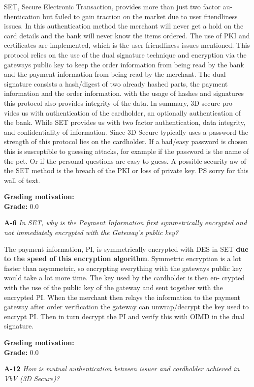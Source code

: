 \documentclass[a4paper]{article}
\newcommand{\Q}[2]{
  \textbf{#1} \textit{#2}
 }
\newcommand{\A}[1]{ #1 }
\newcommand{\Grade}[2]{ 
  \textbf{Grading motivation:} #2 \\ 
  \hspace*{\fill} \textbf{Grade:} #1 
}
\begin{document}
{  SET, Secure Electronic Transaction, provides more than just two factor au-
  thentication but failed to gain traction on the market due to user friendliness
  issues. In this authentication method the merchant will never get a hold on the
  card details and the bank will never know the items ordered. The use of PKI
  and certificates are implemented, which is the user friendliness issues mentioned.
  This protocol relies on the use of the dual signature technique and encryption
  via the gateways public key to keep the order information from being read by
  the bank and the payment information from being read by the merchant. The
  dual signature consists a hash/digest of two already hashed parts, the payment
  information and the order information. with the usage of hashes and signatures
  this protocol also provides integrity of the data. In summary, 3D secure pro-
  vides us with authentication of the cardholder, an optionally authentication of
  the bank. While SET provides us with two factor authentication, data integrity,
  and confidentiality of information. Since 3D Secure typically uses a password
  the strength of this protocol lies on the cardholder. If a bad/easy password is
  chosen this is susceptible to guessing attacks, for example if the password is the
  name of the pet. Or if the personal questions are easy to guess. A possible
  security 
  aw of the SET method is the breach of the PKI or loss of private key.
  PS sorry for this wall of text.
}

\Grade{0.0}{}

\Q{A-6} {In SET, why is the Payment Information first symmetrically encrypted
and not immediately encrypted with the Gateway's public key?}

\A{
  The payment information, PI, is symmetrically encrypted with DES in SET
  \textbf{due to the speed of this encryption algorithm}. Symmetric encryption is
  a lot faster than asymmetric, so encrypting everything with the gateways public
  key would take a lot more time. The key used by the cardholder is then en-
  crypted with the use of the public key of the gateway and sent together with the
  encrypted PI. When the merchant then relays the information to the payment
  gateway after order verification the gateway can unwrap/decrypt the key used
  to encrypt PI. Then in turn decrypt the PI and verify this with OIMD in the
  dual signature.
}

\Grade{0.0}{}

\Q{A-12} {How is mutual authentication between issuer and cardholder achieved
in VbV (3D Secure)?}
\end{document}
